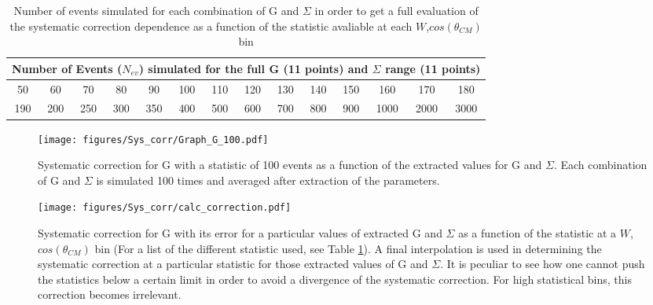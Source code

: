 \begin{table}
  \begin{center}
    \begin{tabular}{ ||c|c|c|c|c|c|c|c|c|c|c|c|c|c||}
      \hline
      \multicolumn{14}{|c|}{Number of Events ($N_{ev}$) simulated for the full G (11 points) and $\Sigma$ range (11 points)  } \\
      \hline
      \hline
      50&60&70&80&90&100&110&120&130&140&150&160&170&180\\
      \hline
      190&200&250&300&350&400&500&600&700&800&900&1000&2000&3000 \\
      \hline
    \end{tabular}
  \end{center}
  \caption{Number of events simulated for each combination of G and $\Sigma$ in order to get a full evaluation of the systematic correction dependence as a function of the statistic avaliable at each $W$,$cos(\theta_{CM})$ bin}
  \label{table:sim_nevents}
\end{table}


\begin{figure}[H]
  \begin{center}
    \texttt{[image: figures/Sys\_corr/Graph\_G\_100.pdf]} \\
    \caption{Systematic correction for G with a statistic of 100 events as a function of the extracted values for G and $\Sigma$. Each combination of G and $\Sigma$ is simulated 100 times and averaged after extraction of the parameters. }
    \label{fig:sys_correction_100}
  \end{center}
\end{figure}
\begin{figure}[H]
  \begin{center}
    \texttt{[image: figures/Sys\_corr/calc\_correction.pdf]} \\
    \caption{Systematic correction for G with its error for a particular values of extracted G and $\Sigma$ as a function of the statistic at a $W$,$cos(\theta_{CM})$ bin (For a list of the different statistic used, see Table \ref{table:sim_nevents}). A final interpolation is used in determining the systematic correction at a particular statistic for those extracted values of G and $\Sigma$. It is peculiar to see how one cannot push the statistics below a certain limit in order to avoid a divergence of the systematic correction. For high statistical bins, this correction becomes irrelevant. }
    \label{fig:calc_sys_correction}
  \end{center}
\end{figure}

